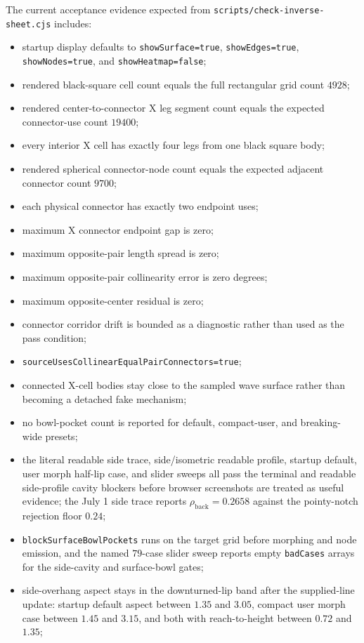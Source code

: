 \documentclass[12pt,letterpaper]{article}
\newcommand{\code}[1]{\texttt{#1}}
\begin{document}
The current acceptance evidence expected from \code{scripts/check-inverse-sheet.cjs} includes:
\begin{itemize}
  \item startup display defaults to \code{showSurface=true}, \code{showEdges=true}, \code{showNodes=true}, and \code{showHeatmap=false};
  \item rendered black-square cell count equals the full rectangular grid count \(4928\);
  \item rendered center-to-connector X leg segment count equals the expected connector-use count \(19400\);
  \item every interior X cell has exactly four legs from one black square body;
  \item rendered spherical connector-node count equals the expected adjacent connector count \(9700\);
  \item each physical connector has exactly two endpoint uses;
  \item maximum X connector endpoint gap is zero;
  \item maximum opposite-pair length spread is zero;
  \item maximum opposite-pair collinearity error is zero degrees;
  \item maximum opposite-center residual is zero;
  \item connector corridor drift is bounded as a diagnostic rather than used as the pass condition;
  \item \code{sourceUsesCollinearEqualPairConnectors=true};
  \item connected X-cell bodies stay close to the sampled wave surface rather than becoming a detached fake mechanism;
  \item no bowl-pocket count is reported for default, compact-user, and breaking-wide presets;
  \item the literal readable side trace, side/isometric readable profile, startup default, user morph half-lip case, and slider sweeps all pass the terminal and readable side-profile cavity blockers before browser screenshots are treated as useful evidence; the July 1 side trace reports \(\rho_{\mathrm{back}}=0.2658\) against the pointy-notch rejection floor \(0.24\);
  \item \code{blockSurfaceBowlPockets} runs on the target grid before morphing and node emission, and the named \(79\)-case slider sweep reports empty \code{badCases} arrays for the side-cavity and surface-bowl gates;
  \item side-overhang aspect stays in the downturned-lip band after the supplied-line update: startup default aspect between \(1.35\) and \(3.05\), compact user morph case between \(1.45\) and \(3.15\), and both with reach-to-height between \(0.72\) and \(1.35\);

\end{itemize}
\end{document}
